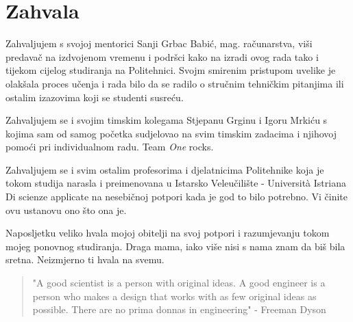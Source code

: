 \chapter*{Zahvala}
Zahvaljujem s svojoj mentorici Sanji Grbac Babić, mag. računarstva, viši predavač na izdvojenom vremenu i podršci kako na izradi ovog rada tako i tijekom cijelog studiranja na Politehnici.
Svojm smirenim pristupom uvelike je olakšala proces učenja i rada bilo da se radilo o stručnim tehničkim pitanjima ili ostalim izazovima koji se studenti susreću.

Zahvaljujem se i svojim timskim kolegama Stjepanu Grginu i Igoru \mbox{Mrkiću} s kojima sam od samog početka sudjelovao na svim timskim zadacima i njihovoj pomoći pri individualnom radu. 
Team \textit{One} rocks.

Zahvaljujem se i svim ostalim profesorima i djelatnicima Politehnike koja je tokom studija narasla i preimenovana u Istarsko Veleučilište - Universit\`{a} Istriana Di scienze applicate na nesebičnoj potpori kada je god to bilo potrebno.
Vi činite ovu ustanovu ono što ona je.

Naposljetku veliko hvala mojoj obitelji na svoj potpori i razumjevanju tokom mojeg ponovnog studiranja.
Draga mama, iako više nisi s nama znam da biš bila sretna.
Neizmjerno ti hvala na svemu.

\vspace*{2cm}

\begin{quotation}
"A good scientist is a person with original ideas. A good engineer is a person who makes a design that works with as few original ideas as possible. There are no prima donnas in engineering" - Freeman Dyson
\end{quotation}